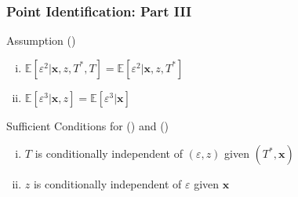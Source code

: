 \documentclass{beamer}
\begin{document}
\begin{frame}
  \frametitle{Point Identification: Part III}

  \begin{block}{Assumption (\clubsuit)}
    \begin{enumerate}[(i)]
    \item $\mathbb{E}[\varepsilon^2|\mathbf{x},z,T^*,T] = \mathbb{E}[\varepsilon^2|\mathbf{x},z, T^*]$
    \item $\mathbb{E}[\varepsilon^3|\mathbf{x},z] = \mathbb{E}[\varepsilon^3|\mathbf{x}]$
  \end{enumerate}
  \end{block}
  
\end{frame}
\begin{frame}
  \begin{alertblock}{Sufficient Conditions for (\spadesuit) and (\clubsuit)}
    \begin{enumerate}[(i)]
      \item $T$ is conditionally independent of $(\varepsilon,z)$ given $(T^*,\mathbf{x})$
      \item $z$ is conditionally independent of $\varepsilon$ given $\mathbf{x}$
    \end{enumerate}
  \end{alertblock}
  
\end{frame}
\end{document}
